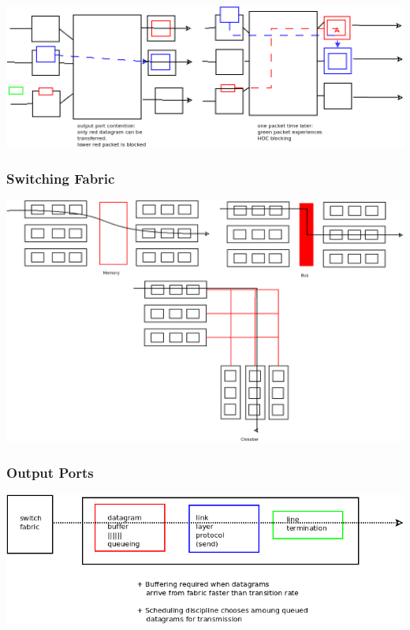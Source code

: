 \documentclass[11pt]{article}
\begin{document}
\begin{center}
\includegraphics[width=.9\linewidth]{../img/hocBlocking.png}
\end{center}

\subsubsection{Switching Fabric}
\label{sec:org7df2c79}

\begin{center}
\includegraphics[width=.9\linewidth]{../img/switchingFabric.png}
\end{center}

\subsubsection{Output Ports}
\label{sec:org547569e}

\begin{center}
\includegraphics[width=.9\linewidth]{../img/outputPorts.png}
\end{center}
\end{document}
